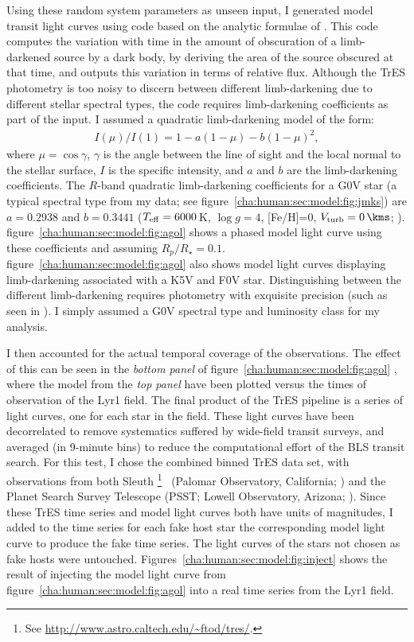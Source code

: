 Using these random system parameters as unseen input, I generated model transit light curves using code based on the analytic formulae of \citet{Mandel_Agol:apjl:2002a}.
This code computes the variation with time in the amount of obscuration of a limb-darkened source by a dark body, by deriving the area of the source obscured at that time, and outputs this variation in terms of relative flux.
Although the TrES photometry is too noisy to discern between different limb-darkening due to different stellar spectral types, the code requires limb-darkening coefficients as part of the input.
I assumed a quadratic limb-darkening model of the form:
\begin{eqnarray*}
\label{cha:human:sec:model:eqn:limb}
I(\mu)/I(1) = 1-a(1-\mu)-b(1-\mu)^2,
\end{eqnarray*}
where $\mu=\cos{\gamma}$, $\gamma$ is the angle between the line of sight and the local normal to the stellar surface, $I$ is the specific intensity, and $a$ and $b$ are the limb-darkening coefficients.
The $R$-band quadratic limb-darkening coefficients for a G0V star (a typical spectral type from my data; see figure~\ref{cha:human:sec:model:fig:jmks}) are $a=0.2938$ and $b=0.3441$ ($T_{\rm eff}=6000$\,K, $\log{g}=4$, [Fe/H]=0, $V_{\rm turb}=0\,\kms$; \citealt{Claret:aa:2000a}).
figure~\ref{cha:human:sec:model:fig:agol} %
shows a phased model light curve using these coefficients and assuming $R_{p}/R_{\star}=0.1$.
figure~\ref{cha:human:sec:model:fig:agol} %
also shows model light curves displaying limb-darkening associated with a K5V and F0V star.
Distinguishing between the different limb-darkening requires photometry with exquisite precision (such as seen in \citealt{Brown_Charbonneau_Gilliland:apj:2001a}).
I simply assumed a G0V spectral type and luminosity class for my analysis.

I then accounted for the actual temporal coverage of the observations.
The effect of this can be seen in the {\it bottom panel} of figure~\ref{cha:human:sec:model:fig:agol}%
, where the model from the {\it top panel} have been plotted versus the times of observation of the Lyr1 field.
The final product of the TrES pipeline is a series of light curves, one for each star in the field.
These light curves have been decorrelated to remove systematics suffered by wide-field transit surveys, and averaged (in 9-minute bins) to reduce the computational effort of the BLS transit search.
For this test, I chose the combined binned TrES data set, with observations from both Sleuth%
\footnote{See \url{http://www.astro.caltech.edu/\~ftod/tres/}.}%
\ (Palomar Observatory, California; \citealt{ODonovan_Charbonneau_Kotredes:AIP:2004a}) and the Planet Search Survey Telescope (PSST;  Lowell Observatory, Arizona; \citealt{Dunham_Mandushev_Taylor:pasp:2004a}).
Since these TrES time series and model light curves both have units of magnitudes, I added to the time series for each fake host star the corresponding model light curve to produce the fake time series.
The light curves of the stars not chosen as fake hosts were untouched.
Figures~\ref{cha:human:sec:model:fig:inject} shows the result of injecting the model light curve from figure~\ref{cha:human:sec:model:fig:agol} %
into a real time series from the Lyr1 field.

